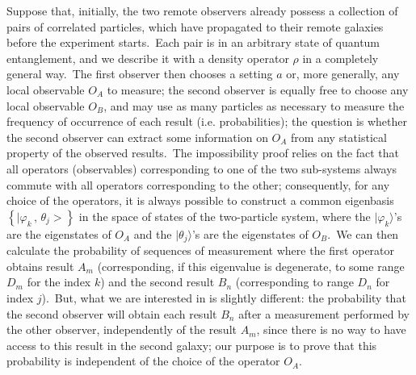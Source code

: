 \documentclass[12pt,onecolumn]{article}%
\begin{document}
Suppose that, initially, the two remote observers already possess a collection
of pairs of correlated particles, which have propagated to their remote
galaxies before the experiment starts.\ Each pair is in an arbitrary state of
quantum entanglement, and we describe it with a density operator $\rho$ in a
completely general way.\ The first observer then chooses a setting $a$ or,
more generally, any local observable $O_{A}$ to measure; the second observer
is equally free to choose any local observable $O_{B}$, and may use as many
particles as necessary to measure the frequency of occurrence of each result
(i.e. probabilities); the question is whether the second observer can extract
some information on $O_{A}$ from any statistical property of the observed
results.\ The impossibility proof relies on the fact that all operators
(observables) corresponding to one of the two sub-systems always commute with
all operators corresponding to the other; consequently, for any choice of the
operators, it is always possible to construct a common eigenbasis $\left\{
|\varphi_{k}\,,\,\theta_{j}>\right\}  $ in the space of states of the
two-particle system, where the $|\varphi_{k}\rangle$'s are the eigenstates of
$O_{A}$ and the $|\theta_{j}\rangle$'s are the eigenstates of $O_{B}$.\ We can
then calculate the probability of sequences of measurement where the first
operator obtains result $A_{m}$ (corresponding, if this eigenvalue is
degenerate, to some range $D_{m}$ for the index $k$) and the second result
$B_{n}$ (corresponding to range $D_{n}$ for index $j$).\ But, what we are
interested in is slightly different: the probability that the second observer
will obtain each result $B_{n}$ after a measurement performed by the other
observer, independently of the result $A_{m}$, since there is no way to have
access to this result in the second galaxy; our purpose is to prove that this
probability is independent of the choice of the operator $O_{A}$.
\end{document}
